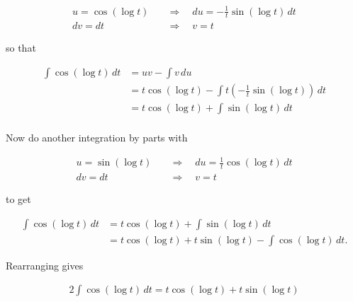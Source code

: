 \documentclass[12pt, letterpaper]{article}
\begin{document}
\begin{equation*}
\begin{aligned}
u = \cos{\left(\log{t}\right)} \quad &\Rightarrow\quad du = -\tfrac{1}{t} \sin{\left( \log{t} \right)} \, dt \\
dv = dt \quad &\Rightarrow\quad v = t
\end{aligned}
\end{equation*}

so that

\begin{equation*}
\begin{aligned}
\int \cos{\left(\log{t}\right)} \, dt
  &= uv - \int v \, du \\[0.2in]
  &= t\cos{\left(\log{t}\right)} - \int t \left( -\tfrac{1}{t} \sin{\left( \log{t} \right)} \right) \, dt \\[0.2in]
  &= t\cos{\left(\log{t}\right)} + \int \sin{\left( \log{t} \right)} \, dt \\[0.2in]
\end{aligned}
\end{equation*}

Now do another integration by parts with

\begin{equation*}
\begin{aligned}
u = \sin{\left(\log{t}\right)} \quad &\Rightarrow\quad du = \tfrac{1}{t} \cos{\left( \log{t} \right)} \, dt \\
dv = dt \quad &\Rightarrow\quad v = t
\end{aligned}
\end{equation*}

to get

\begin{equation*}
\begin{aligned}
\int \cos{\left(\log{t}\right)} \, dt
  &= t\cos{\left(\log{t}\right)} + \int \sin{\left( \log{t} \right)} \, dt \\[0.2in]
  &= t\cos{\left(\log{t}\right)} + t\sin{\left(\log{t}\right)} - \int \cos{\left( \log{t} \right)} \, dt.
\end{aligned}
\end{equation*}

Rearranging gives

\begin{equation*}
\begin{aligned}
2\int \cos{\left(\log{t}\right)} \, dt
  = t\cos{\left(\log{t}\right)} + t\sin{\left(\log{t}\right)}
\end{aligned}
\end{equation*}
\end{document}
